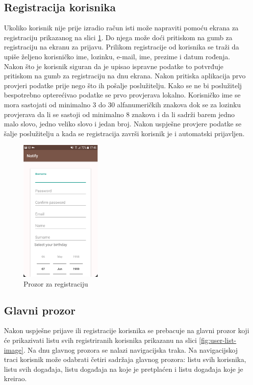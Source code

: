 \documentclass[times, utf8, zavrsni]{fer}
\begin{document}
\subsection{Registracija korisnika}
Ukoliko korisnik nije prije izradio račun isti može napraviti pomoću ekrana za registraciju prikazanog na slici \ref{fig:register-image}. Do njega može doći pritiskom na gumb za registraciju  na ekranu za prijavu. Prilikom registracije od korisnika se traži da upiše željeno korisničko ime, lozinku, e-mail, ime, prezime i datum rođenja. Nakon što je korisnik siguran da je upisao ispravne podatke to potvrđuje pritiskom na gumb za registraciju na dnu ekrana. Nakon pritiska aplikacija prvo provjeri podatke prije nego što ih pošalje poslužitelju. Kako se ne bi poslužitelj bespotrebno opterećivao podatke se prvo provjerava lokalno. Korisničko ime se mora sastojati od minimalno 3 do 30 alfanumeričkih znakova dok se za lozinku provjerava da li se sastoji od minimalno 8 znakova i da li sadrži barem jedno malo slovo, jedno veliko slovo i jedan broj. Nakon uspješne provjere podatke se šalje poslužitelju a kada se registracija završi korisnik je i automatski prijavljen.

\begin{figure}[htb]
\centering
\includegraphics[width=4cm]{img/ss-register.png}
\caption{Prozor za registraciju}
\label{fig:register-image}
\end{figure}

\subsection{Glavni prozor}
Nakon uspješne prijave ili registracije korisnika se prebacuje na glavni prozor koji će prikazivati listu svih registriranih korisnika prikazanu na slici \ref{fig:user-list-image}. Na dnu glavnog prozora se nalazi navigacijska traka. Na navigacijskoj traci korisnik može odabrati četiri sadržaja glavnog prozora: listu svih korisnika, listu svih događaja, listu događaja na koje je pretplaćen i listu događaja koje je kreirao.
\end{document}
